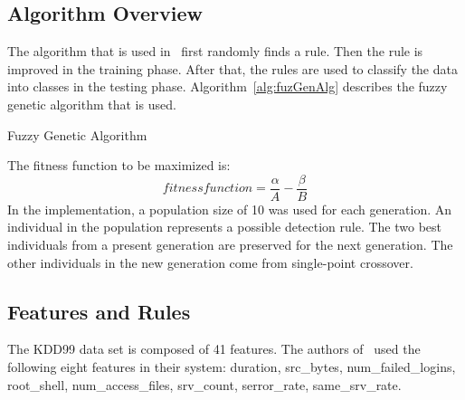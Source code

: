 \documentclass{sig-alternate}
\begin{document}
\subsection{Algorithm Overview}
The algorithm that is used in~\cite{6496342, 6559603} first randomly finds a rule. Then the rule is improved in the training phase. After that, the rules are used to classify the data into classes in the testing phase. Algorithm~\ref{alg:fuzGenAlg} describes the fuzzy genetic algorithm that is used. 

\begin{algorithm}
\caption{Fuzzy Genetic Algorithm}
\label{alg:fuzGenAlg}
\begin{algorithmic}

    \ENDFOR
    
      \ELSE {}
    \ENDIF
  \ENDFOR
  
\ENDFOR
{}
\end{algorithmic}
\end{algorithm}


The fitness function to be maximized is:
\begin{equation*}
fitness function = \frac{\alpha}{A} - \frac{\beta}{B}
\end{equation*}
In the implementation, a population size of 10 was used for each generation. An individual in the population represents a possible detection rule. The two best individuals from a present generation are preserved for the next generation. The other individuals in the new generation come from single-point crossover.




\subsection{Features and Rules}
The KDD99 data set is composed of 41 features. The authors of~\cite{6496342, 6559603} used the following eight features in their system: duration, src\_bytes, num\_failed\_logins, root\_shell, num\_access\_files, srv\_count, serror\_rate, same\_srv\_rate.
\end{document}
